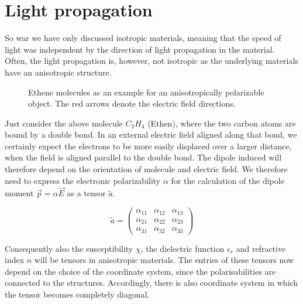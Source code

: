 \documentclass[
  a4paper,
]{book}
\begin{document}
\section{Light propagation}\label{light-propagation}

So war we have only discussed isotropic materials, meaning that the
speed of light was independent by the direction of light propagation in
the material. Often, the light propagation is, however, not isotropic as
the underlying materials have an anisotropic structure.

\begin{figure}


\caption{\label{fig-anisotropy}Ethene molecules as an example for an
anisotropically polarizable object. The red arrows denote the electric
field directions.}

\end{figure}%

Just consider the above molecule \(C_2H_4\) (Ethen), where the two
carbon atoms are bound by a double bond. In an external electric field
aligned along that bond, we certainly expect the electrons to be more
easily displaced over a larger distance, when the field is aligned
parallel to the double bond. The dipole induced will therefore depend on
the orientation of molecule and electric field. We therefore need to
express the electronic polarizability \(\alpha\) for the calculation of
the dipole moment \(\vec{p}=\alpha \vec{E}\) as a tensor
\(\overleftrightarrow{a}\).

\[
\overleftrightarrow{a}=
\begin{pmatrix}
\alpha_{11} & \alpha_{12} & \alpha_{13} \\
\alpha_{21} & \alpha_{22} & \alpha_{23} \\
\alpha_{31} & \alpha_{32} & \alpha_{33}
\end{pmatrix}
\]

Consequently also the susceptibility \(\chi\), the dielectric function
\(\epsilon_r\) and refractive index \(n\) will be tensors in anisotropic
materials. The entries of these tensors now depend on the choice of the
coordinate system, since the polarisabilities are connected to the
structures. Accordingly, there is also coordinate system in which the
tensor becomes completely diagonal.
\end{document}
